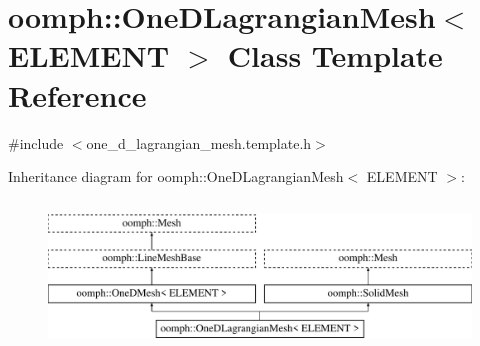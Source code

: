 \hypertarget{classoomph_1_1OneDLagrangianMesh}{}\section{oomph\+:\+:One\+D\+Lagrangian\+Mesh$<$ E\+L\+E\+M\+E\+NT $>$ Class Template Reference}
\label{classoomph_1_1OneDLagrangianMesh}


{\ttfamily \#include $<$one\+\_\+d\+\_\+lagrangian\+\_\+mesh.\+template.\+h$>$}

Inheritance diagram for oomph\+:\+:One\+D\+Lagrangian\+Mesh$<$ E\+L\+E\+M\+E\+NT $>$\+:\begin{figure}[H]
\begin{center}
\leavevmode
\includegraphics[height=4.000000cm]{classoomph_1_1OneDLagrangianMesh}
\end{center}
\end{figure}
